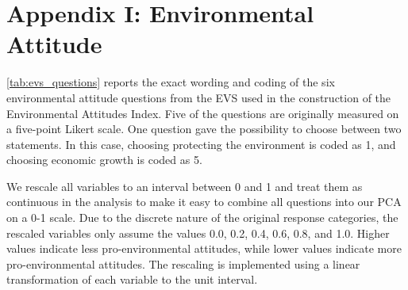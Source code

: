 \documentclass[12pt, a4paper]{article}
\begin{document}
\newpage
\setlength{\parindent}{0pt}
\setlength{\parskip}{6pt}

\nocite{*}
\printbibliography[title={References}]

\newpage



\section*{Appendix I: Environmental Attitude}

\autoref{tab:evs_questions} reports the exact wording and coding of the six environmental 
attitude questions from the EVS used in the construction of the Environmental Attitudes Index.
Five of the questions are originally measured on a five-point Likert scale. 
One question gave the possibility to choose between two statements. 
In this case, choosing protecting the environment is coded as 1, and choosing economic growth is coded as 5.

We rescale all variables to an interval between 0 and 1 and treat them as continuous in the analysis 
to make it easy to combine all questions into our PCA on a 0-1 scale. Due to the discrete nature of the original response 
categories, the rescaled variables only assume the values 0.0, 0.2, 0.4, 0.6, 0.8, and 1.0. Higher values indicate 
less pro-environmental attitudes, while lower values indicate more pro-environmental attitudes.
The rescaling is implemented using a linear transformation of each variable to the unit interval. 
\end{document}
